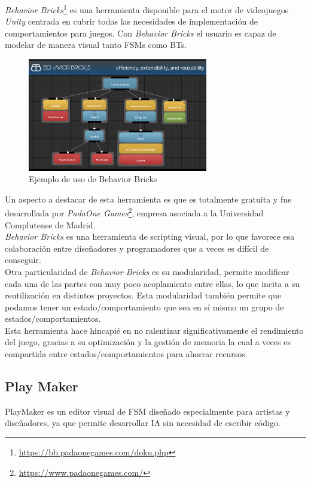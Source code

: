 \textit{Behavior Bricks}\footnote{\url{https://bb.padaonegames.com/doku.php}} es una herramienta disponible para el motor de videojuegos \textit{Unity} centrada en cubrir todas las necesidades de implementación de comportamientos para juegos. Con \textit{Behavior Bricks} el usuario es capaz de modelar de manera visual tanto FSMs como BTs.\\
\begin{figure}[t]
	\centering
	\includegraphics[width = 0.7\textwidth]{Imagenes/Behavior_Bricks.jpg}
	\caption{Ejemplo de uso de Behavior Bricks}
	\label{fig:BH_Figure}
\end{figure}
Un aspecto a destacar de esta herramienta es que es totalmente gratuita y fue desarrollada por \textit{PadaOne Games}\footnote{\url{https://www.padaonegames.com/}}, empresa asociada a la Universidad Complutense de Madrid.\\
\textit{Behavior Bricks} es una herramienta de scripting visual, por lo que favorece esa colaboración entre diseñadores y programadores que a veces es difícil de conseguir.\\
Otra particularidad de \textit{Behavior Bricks} es su modularidad, permite modificar cada una de las partes con muy poco acoplamiento entre ellas, lo que incita a su reutilización en distintos proyectos. Esta modularidad también permite que podamos tener un estado/comportamiento que sea en sí mismo un grupo de estados/comportamientos.\\
Esta herramienta hace hincapié en no ralentizar significativamente el rendimiento del juego, gracias a su optimización y la gestión de memoria la cual a veces es compartida entre estados/comportamientos para ahorrar recursos.\\

\subsection{Play Maker}
PlayMaker es un editor visual de FSM diseñado especialmente para artistas y diseñadores, ya que permite desarrollar IA sin necesidad de escribir código.

